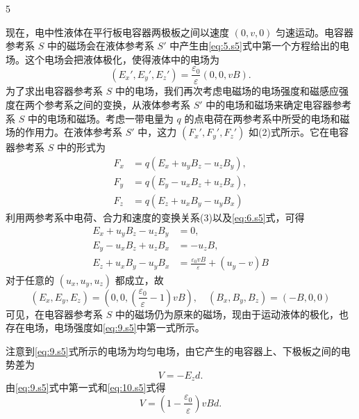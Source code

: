 \begin{solution}{5}
\begin{subsolution}
现在，电中性液体在平行板电容器两极板之间以速度 $(0, v, 0)$ 匀速运动。电容器参考系 $S$ 中的磁场会在液体参考系 $S'$ 中产生由\eqref{eq:5.s5}式中第一个方程给出的电场。这个电场会把液体极化，使得液体中的电场为
\begin{equation}
(E_x', E_y', E_z') = \frac{\varepsilon_0}{\varepsilon} (0, 0, v B).
\label{eq:6.s5}
\end{equation}
为了求出电容器参考系 $S$ 中的电场，我们再次考虑电磁场的电场强度和磁感应强度在两个参考系之间的变换，从液体参考系 $S'$ 中的电场和磁场来确定电容器参考系 $S$ 中的电场和磁场。考虑一带电量为 $q$ 的点电荷在两参考系中所受的电场和磁场的作用力。在液体参考系 $S'$ 中，这力 $(F_x', F_y', F_z')$ 如(2)式所示。它在电容器参考系 $S$ 中的形式为
\begin{align}
F_x &= q(E_x + u_y B_z - u_z B_y), \nonumber\\
F_y &= q(E_y - u_x B_z + u_z B_x), \nonumber\\
F_z &= q(E_z + u_x B_y - u_y B_x) \nonumber
\end{align}
利用两参考系中电荷、合力和速度的变换关系(3)以及\eqref{eq:6.s5}式，可得
\begin{align}
E_x + u_y B_z - u_z B_y &= 0, \nonumber\\
E_y - u_x B_z + u_z B_x &= -u_z B, \nonumber\\
E_z + u_x B_y - u_y B_x &= \frac{\varepsilon_0 v B}{\varepsilon} + (u_y - v) B \nonumber
\end{align}
对于任意的 $(u_x, u_y, u_z)$ 都成立，故
\begin{equation}
(E_x, E_y, E_z) = (0, 0, (\frac{\varepsilon_0}{\varepsilon} - 1) v B), \quad (B_x, B_y, B_z) = (-B, 0, 0)
\label{eq:9.s5}
\end{equation}
可见，在电容器参考系 $S$ 中的磁场仍为原来的磁场，现由于运动液体的极化，也存在电场，电场强度如\eqref{eq:9.s5}中第一式所示。

注意到\eqref{eq:9.s5}式所示的电场为均匀电场，由它产生的电容器上、下极板之间的电势差为
\begin{equation}
V = -E_z d.
\label{eq:10.s5}
\end{equation}
由\eqref{eq:9.s5}式中第一式和\eqref{eq:10.s5}式得
\begin{equation}
V = \left(1 - \frac{\varepsilon_0}{\varepsilon}\right) v B d.
\label{eq:11.s5}
\end{equation}
\end{subsolution}
\end{solution}